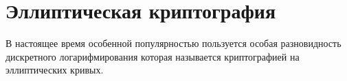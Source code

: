 \chapter{Эллиптическая криптография}
В настоящее время особенной популярностью пользуется особая
разновидность дискретного логарифмирования которая называется
криптографией на эллиптических кривых.

